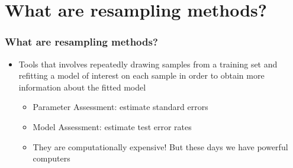 \documentclass[
  shownotes,
  xcolor={svgnames},
  hyperref={colorlinks,citecolor=DarkBlue,linkcolor=andesred,urlcolor=DarkBlue}
  , aspectratio=169]{beamer}
\begin{document}
\section{What are resampling methods?}
\begin{frame}[fragile]
\frametitle{What are resampling methods?}

\begin{itemize}
\item Tools that involves repeatedly drawing samples from a training set and refitting a model of interest on each sample in order to obtain more information about the fitted model
\medskip
\begin{itemize}
  \item Parameter Assessment: estimate standard errors
  \medskip
  \item Model Assessment: estimate test error rates 
  \medskip
  \item They are computationally expensive! But these days we have powerful computers
\end{itemize}
\end{itemize}

\end{frame}

\end{document}
